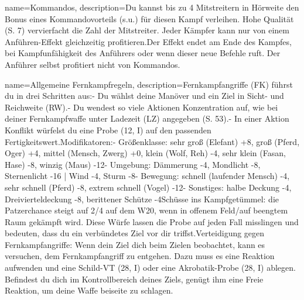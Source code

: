 {
    name={Kommandos},
    description={Du kannst bis zu 4 Mitstreitern in Hörweite den Bonus eines Kommandovorteils (s.u.) für diesen Kampf verleihen. Hohe Qualität (S. 7) vervierfacht die Zahl der Mitstreiter. Jeder Kämpfer kann nur von einem Anführen-Effekt gleichzeitig profitieren.\newline     Der Effekt endet am Ende des Kampfes, bei Kampfunfähigkeit des Anführers oder wenn dieser neue Befehle ruft. Der Anführer selbst profitiert nicht von Kommandos.}
}


{
    name={Allgemeine Fernkampfregeln},
    description={Fernkampfangriffe (FK) führst du in drei Schritten aus:\newline - Du wählst deine Manöver und ein Ziel in Sicht- und Reichweite (RW).\newline - Du wendest so viele Aktionen Konzentration auf, wie bei deiner Fernkampfwaffe unter Ladezeit (LZ) angegeben (S. 53).\newline - In einer Aktion Konflikt würfelst du eine Probe (12, I) auf den passenden Fertigkeitswert.\newline Modifikatoren:\newline - Größenklasse: sehr groß (Elefant) +8, groß (Pferd, Oger) +4, mittel (Mensch, Zwerg) +0, klein (Wolf, Reh) -4, sehr klein (Fasan, Hase) -8, winzig (Maus) -12\newline - Umgebung: Dämmerung -4, Mondlicht -8, Sternenlicht -16 | Wind -4, Sturm -8\newline - Bewegung: schnell (laufender Mensch) -4, sehr schnell (Pferd) -8, extrem schnell (Vogel) -12\newline - Sonstiges: halbe Deckung -4, Dreivierteldeckung -8, berittener Schütze -4\newline Schüsse ins Kampfgetümmel: die Patzerchance steigt auf 2/4 auf dem W20, wenn in offenem Feld/auf beengtem Raum gekämpft wird. Diese Würfe lassen die Probe auf jeden Fall misslingen und bedeuten, dass du ein verbündetes Ziel vor dir triffst.\newline Verteidigung gegen Fernkampfangriffe: Wenn dein Ziel dich beim Zielen beobachtet, kann es versuchen, dem Fernkampfangriff zu entgehen. Dazu muss es eine Reaktion aufwenden und eine Schild-VT (28, I) oder eine Akrobatik-Probe (28, I) ablegen. Befindest du dich im Kontrollbereich deines Ziels, genügt ihm eine Freie Reaktion, um deine Waffe beiseite zu schlagen.}
}


